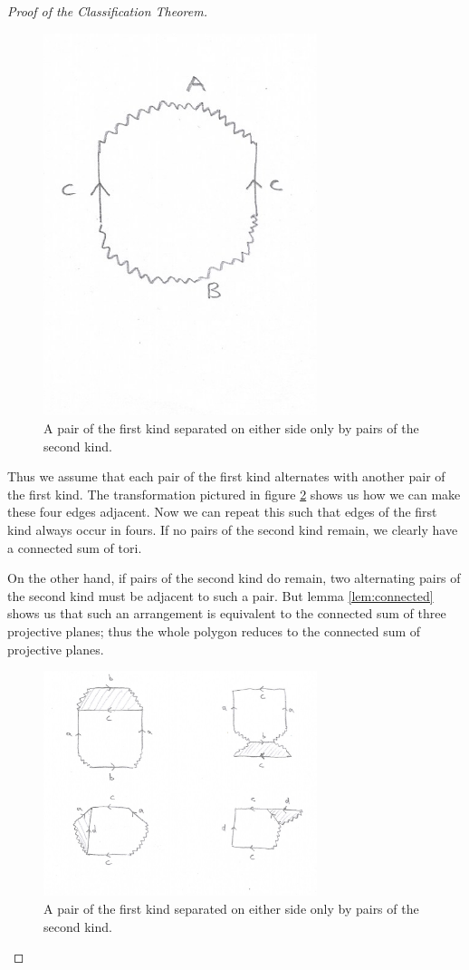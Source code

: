 \begin{proof}[Proof of the Classification Theorem]
   \begin{figure}[htbp]
     \centering
     \includegraphics[width=8cm]{contr.png}
     \caption{A pair of the first kind separated on either side only
       by pairs of the second kind.}
     \label{fig:first-contradiction}
   \end{figure}

   Thus we assume that each pair of the first kind alternates with
   another pair of the first kind. The transformation pictured in
   figure \ref{fig:last} shows us how we can make these four edges
   adjacent. Now we can repeat this such that edges of the first kind
   always occur in fours. If no pairs of the second kind remain, we
   clearly have a connected sum of tori.

   On the other hand, if pairs of the second kind do remain, two
   alternating pairs of the second kind must be adjacent to such a
   pair. But lemma \ref{lem:connected} shows us that such an
   arrangement is equivalent to the connected sum of three projective
   planes; thus the whole polygon reduces to the connected sum of
   projective planes.

   \begin{figure}[htbp]
     \centering
     \includegraphics[width=8cm]{las.png}
     \caption{A pair of the first kind separated on either side only
       by pairs of the second kind.}
     \label{fig:last}          
   \end{figure}
 \end{proof}

